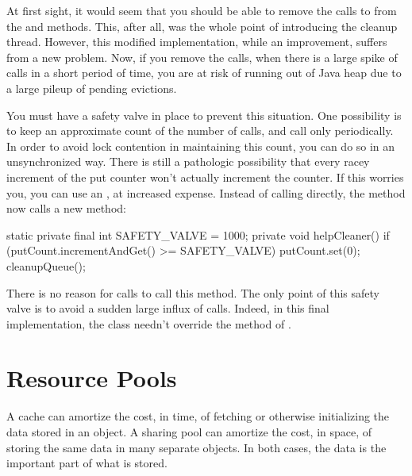 At first sight, it would seem that you should be able to remove the calls to
 from the  and  methods. This, after all,
was the whole point of introducing the cleanup thread. However, this modified
implementation, while an improvement, suffers from a new problem. Now, if you
remove the  calls, when there is a large spike of 
calls in a short period of time, you are at risk of running out of Java heap due
to a large pileup of pending evictions.

You must have a safety valve in place to prevent this situation. One possibility
is to keep an approximate count of the number of  calls, and call
 only periodically. In order to avoid lock contention in
maintaining this count, you can do so in an unsynchronized way. There is still a
pathologic possibility that every racey increment of the put counter won't
actually increment the counter. If this worries you, you can use an
, at increased expense. Instead of calling
 directly, the  method now calls a new
 method:
\begin{shortlisting}
   static private final int SAFETY_VALVE = 1000;
   private void helpCleaner() {
      if (putCount.incrementAndGet() >= SAFETY_VALVE) {
         putCount.set(0);
         cleanupQueue();
      }
   }
\end{shortlisting}
There is no reason for  calls to call this method. The only point of
this safety valve is to avoid a sudden large influx of  calls. Indeed,
in this final implementation, the  class needn't override
the  method of .



\section{Resource Pools}
\label{sec:resource-pools}

A cache can amortize the cost, in time, of fetching or otherwise initializing the
data stored in an object. A sharing pool can amortize the cost, in space, of
storing the same data in many separate objects. In both cases, the data is the
important part of what is stored.

